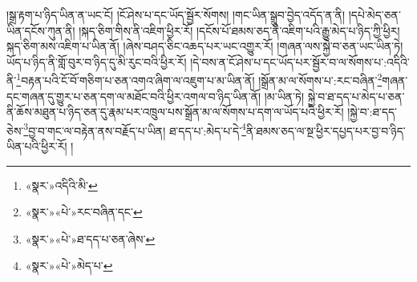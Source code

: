 །སྒྲ་རྟག་པ་ཉིད་ཡིན་ན་ཡང་ངོ། །ངོ་ཤེས་པ་དང་ཡོད་སྦྱོར་སོགས། །གང་ཡིན་སྒྲུབ་བྱེད་འདོད་ན་ནི། །དཔེ་མེད་ཅན་ཡིན་དངོས་ཀུན་ནི། །སྐད་ཅིག་གིས་ནི་འཇིག་ཕྱིར་རོ། །དངོས་པོ་ཐམས་ཅད་ནི་འཇིག་པའི་རྒྱུ་མེད་པ་ཉིད་ཀྱི་ཕྱིར། སྐད་ཅིག་མས་འཇིག་པ་ཡིན་ནོ། །ཞེས་བཤད་ཅིང་འཆད་པར་ཡང་འགྱུར་རོ། །གཞན་ལས་སྐྱེ་བ་ཅན་ཡང་ཡིན་ཏེ། ཡོད་པ་ཉིད་ནི་གློ་བུར་བ་ཉིད་དུ་མི་རུང་བའི་ཕྱིར་རོ། །དེ་བས་ན་ངོ་ཤེས་པ་དང་ཡོད་པར་སྦྱོར་བ་ལ་སོགས་པ་:འདིའི་ནི་\footnote{«སྣར་»འདིའི་མི་}བརྟན་པའི་ངོ་བོ་གཅིག་པ་ཅན་འགའ་ཞིག་ལ་འཇུག་པ་མ་ཡིན་ནོ། །སྒྲོན་མ་ལ་སོགས་པ་:རང་བཞིན་\footnote{«སྣར་»«པེ་»རང་བཞིན་དང་}གཞན་དང་གཞན་དུ་གྱུར་པ་ཅན་དག་ལ་མཐོང་བའི་ཕྱིར་འགལ་བ་ཉིད་ཡིན་ནོ། །མ་ཡིན་ཏེ། སྐྱེ་བ་ཐ་དད་པ་མེད་པ་ཅན་ནི་ཆོས་མཐུན་པ་ཉིད་ཅན་དུ་རྣམ་པར་འཁྲུལ་པས་སྒྲོན་མ་ལ་སོགས་པ་དག་ལ་ཡོད་པའི་ཕྱིར་རོ། །སྐྱེ་བ་:ཐ་དད་ཅེས་\footnote{«སྣར་»«པེ་»ཐ་དད་པ་ཅན་ཞེས་}བྱ་བ་གང་ལ་བརྟེན་ནས་བརྗོད་པ་ཡིན། ཐ་དད་པ་:མེད་པ་དེ་\footnote{«སྣར་»«པེ་»མེད་པ་}ནི་ཐམས་ཅད་ལ་སྔ་ཕྱིར་དཔྱད་པར་བྱ་བ་ཉིད་ཡིན་པའི་ཕྱིར་རོ། །
